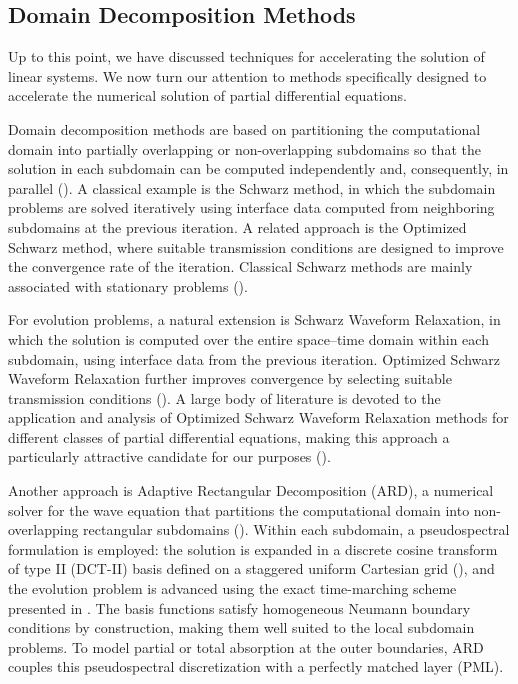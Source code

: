 \documentclass{Configuration_Files/PoliMi3i_thesis}
\begin{document}
\subsection{Domain Decomposition Methods}
Up to this point, we have discussed techniques for accelerating the solution of linear systems. We now turn our attention to methods specifically designed to accelerate the numerical solution of partial differential equations.

Domain decomposition methods are based on partitioning the computational domain into partially overlapping or non-overlapping subdomains so that the solution in each subdomain can be computed independently and, consequently, in parallel (\cite{quarteroni_domain_1999}). A classical example is the Schwarz method, in which the subdomain problems are solved iteratively using interface data computed from neighboring subdomains at the previous iteration. A related approach is the Optimized Schwarz method, where suitable transmission conditions are designed to improve the convergence rate of the iteration. Classical Schwarz methods are mainly associated with stationary problems (\cite{dolean_introduction_2015}).

For evolution problems, a natural extension is Schwarz Waveform Relaxation, in which the solution is computed over the entire space--time domain within each subdomain, using interface data from the previous iteration. Optimized Schwarz Waveform Relaxation further improves convergence by selecting suitable transmission conditions (\cite{barth_schwarz_2008}). A large body of literature is devoted to the application and analysis of Optimized Schwarz Waveform Relaxation methods for different classes of partial differential equations, making this approach a particularly attractive candidate for our purposes (\cite{gander_optimal_1999,martin_optimized_2005,gander_optimized_2007,al-khaleel_optimized_2024,ciaramella_convergence_2024}).

Another approach is Adaptive Rectangular Decomposition (ARD), a numerical solver for the wave equation that partitions the computational domain into non-overlapping rectangular subdomains (\cite{raghuvanshi_efficient_2009}). Within each subdomain, a pseudospectral formulation is employed: the solution is expanded in a discrete cosine transform of type II (DCT-II) basis defined on a staggered uniform Cartesian grid (\cite{rao_discrete_1990}), and the evolution problem is advanced using the exact time-marching scheme presented in \cite{cieslinski_exact_2011}. The basis functions satisfy homogeneous Neumann boundary conditions by construction, making them well suited to the local subdomain problems. To model partial or total absorption at the outer boundaries, ARD couples this pseudospectral discretization with a perfectly matched layer (PML).
\end{document}
